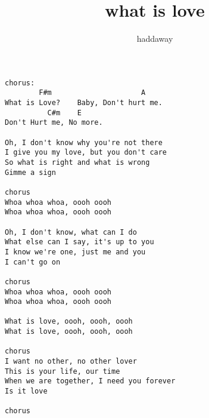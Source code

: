 \author{haddaway}
\title{what is love}
\maketitle
\begin{verbatim}
chorus:
        F#m                     A
What is Love?    Baby, Don't hurt me.
          C#m    E
Don't Hurt me, No more.

Oh, I don't know why you're not there 
I give you my love, but you don't care 
So what is right and what is wrong 
Gimme a sign 

chorus
Whoa whoa whoa, oooh oooh 
Whoa whoa whoa, oooh oooh 

Oh, I don't know, what can I do 
What else can I say, it's up to you 
I know we're one, just me and you 
I can't go on 

chorus
Whoa whoa whoa, oooh oooh 
Whoa whoa whoa, oooh oooh 

What is love, oooh, oooh, oooh 
What is love, oooh, oooh, oooh 

chorus
I want no other, no other lover 
This is your life, our time 
When we are together, I need you forever 
Is it love 

chorus
\end{verbatim}